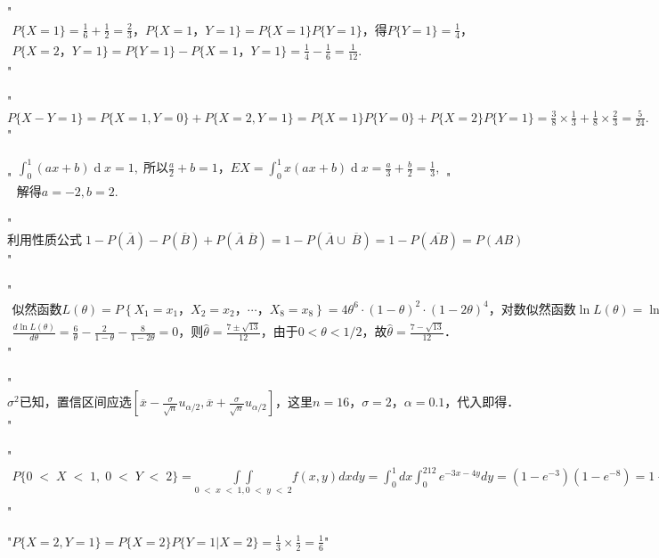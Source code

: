 "$\begin{array}{l}P\{X=1\}=\frac16+\frac12=\frac23，P\{X=1，Y=1\}=P\{X=1\}P\{Y=1\}，得P\{Y=1\}=\frac14，\\P\{X=2，Y=1\}=P\{Y=1\}-P\{X=1，Y=1\}=\frac14-\frac16=\frac1{12}.\end{array}$"


"$P\{X-Y=1\}=P\{X=1,Y=0\}+P\{X=2,Y=1\}=P\{X=1\}P\{Y=0\}+P\{X=2\}P\{Y=1\}=\frac38\times\frac13+\frac18\times\frac23=\frac5{24}.$"


"$\begin{array}{l}\int_0^1(ax+b)\operatorname dx=1,\;\mathrm{所以}\frac a2+b=1，EX=\int_0^1x(ax+b)\operatorname dx=\frac a3+\frac b2=\frac13,\\\mathrm{解得}a=-2,b=2.\end{array}$"


"$\mathrm{利用性质公式}\;1-P(\overline A)-P(\overline B)+P(\overline A\;\overline B)=1-P(\overline A\cup\;\overline B)=1-P(\overline{AB})=P(AB)$"


"$\begin{array}{l}\mathrm{似然函数}L\left(\theta\right)=P\left\{X_1=x_1，X_2=x_2，\cdots，X_8=x_8\right\}=4\theta^6\cdot\left(1-\theta\right)^2\cdot\left(1-2\theta\right)^4，\mathrm{对数似然函数}\ln L\left(\theta\right)=\ln4+6\ln\theta+2\ln\left(1-\theta\right)+4\ln\left(1-2\theta\right)，\\\frac{d\ln L\left(\theta\right)}{d\theta}=\frac6\theta-\frac2{1-\theta}-\frac8{1-2\theta}=0，\mathrm 则\widehat\theta=\frac{7\pm\sqrt{13}}{12}，\mathrm{由于}0<\theta<1/2，\mathrm 故\widehat\theta=\frac{7-\sqrt{13}}{12}．\end{array}$"


"$\sigma^2\mathrm{已知}，\mathrm{置信区间应选}\left[\overline x-\frac\sigma{\sqrt n}u_{\alpha/2},\overline x+\frac\sigma{\sqrt n}u_{\alpha/2}\right]，\mathrm{这里}n=16，\sigma=2，\alpha=0.1，\mathrm{代入即得}．$"


"$\begin{array}{l}P\{0\;<\;X\;<\;1,\;0\;<\;Y\;<\;2\}=\underset{0\;<\;x\;<\;1,0\;<\;y\;<\;2}{\int\int}f(x,y)dxdy=\int_0^1dx\int_0^212e^{-3x-4y}dy=(1-e^{-3})(1-e^{-8})=1-e^{-3}-e^{-8}+e^{-11}.\\\end{array}$"


"$P\{X=2,Y=1\}=P\{X=2\}P\{Y=1\vert X=2\}=\frac13\times\frac12=\frac16$"


